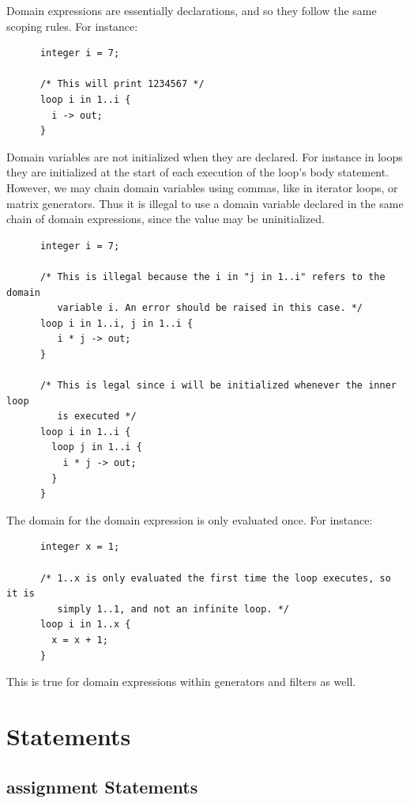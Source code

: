 \documentclass{article}
\begin{document}
    Domain expressions are essentially declarations, and so they follow the same scoping rules. For instance:

    \begin{lstlisting}
      integer i = 7;

      /* This will print 1234567 */
      loop i in 1..i {
        i -> out;
      }
    \end{lstlisting}

    Domain variables are not initialized when they are declared. For instance in loops they are initialized at the
    start of each execution of the loop's body statement. However, we may chain domain variables using commas, like
    in iterator loops, or matrix generators. Thus it is illegal to use a domain variable declared in the same chain
    of domain expressions, since the value may be uninitialized.

    \begin{lstlisting}
      integer i = 7;

      /* This is illegal because the i in "j in 1..i" refers to the domain
         variable i. An error should be raised in this case. */
      loop i in 1..i, j in 1..i {
         i * j -> out;
      }

      /* This is legal since i will be initialized whenever the inner loop
         is executed */
      loop i in 1..i {
        loop j in 1..i {
          i * j -> out;
        }
      }
    \end{lstlisting}

    The domain for the domain expression is only evaluated once. For instance:

    \begin{lstlisting}
      integer x = 1;

      /* 1..x is only evaluated the first time the loop executes, so it is
         simply 1..1, and not an infinite loop. */
      loop i in 1..x {
        x = x + 1;
      }
    \end{lstlisting}

    This is true for domain expressions within generators and filters as well.


\section{Statements}\label{sec:statements}

  \subsection{assignment Statements}\label{sec:assignment}
\end{document}
